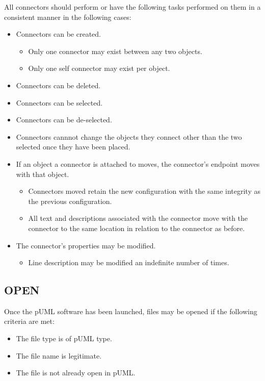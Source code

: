 \documentclass[twoside,letterpaper]{article}
\begin{document}
All connectors should perform or have the following tasks performed on them in a consistent manner in the following cases: 
\begin{itemize}
	\item Connectors can be created.
\begin{itemize}
\item Only one connector may exist between any two objects.
\item Only one self connector may exist per object.
\end{itemize}
	\item Connectors can be deleted.
	\item Connectors can be selected.
	\item Connectors can be de-selected.
\item Connectors cannnot change the objects they connect other than the two selected once they have been placed.
\item If an object a connector is attached to moves, the connector's endpoint moves with that object. 
\begin{itemize}
\item Connectors moved retain the new configuration with the same integrity as the previous configuration.
\item All text and descriptions associated with the connector move with the connector to the same location in relation to the connector as before.
\end{itemize}
	\item The connector's properties may be modified.
\begin{itemize}
\item Line description may be modified an indefinite number of times.
\end{itemize}
\end{itemize}

\bigskip

\subsection[OPEN]{\bfseries OPEN}

Once the pUML software has been launched, files may be opened if the following criteria are met:

\begin{itemize}
\item The file type is of pUML type.
\item The file name is legitimate.
\item The file is not already open in pUML.
\end{itemize}
\end{document}
